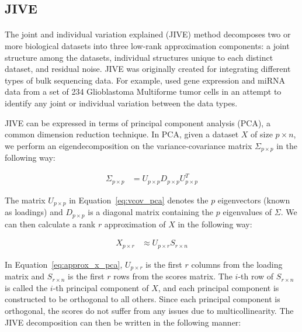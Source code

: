\documentclass[
12pt, %
letterpaper, %
oneside, %
headinclude,footinclude, %
BCOR5mm, %
]{scrartcl}
\begin{document}

\subsection{JIVE}

\paragraph*{}
The joint and individual variation explained (JIVE) method \citep{lock2013joint} decomposes two or more biological datasets into three low-rank approximation components: a joint structure among the datasets, individual structures unique to each distinct dataset, and residual noise. JIVE was originally created for integrating different types of bulk sequencing data. For example, \citet{lock2013joint} used gene expression and miRNA data from a set of 234 Glioblastoma Multiforme tumor cells in an attempt to identify any joint or individual variation between the data types. 

JIVE can be expressed in terms of principal component analysis (PCA), a common dimension reduction technique. In PCA, given a dataset $X$ of size $p \times n$, we perform an eigendecomposition on the variance-covariance matrix $\Sigma_{p \times p}$ in the following way:

\begin{align}
    \Sigma_{p \times p} &= U_{p \times p} D_{p \times p} U_{p \times p}^T
    \label{eq:vcov_pca}
\end{align}

The matrix $U_{p \times p}$ in Equation~\ref{eq:vcov_pca} denotes the $p$ eigenvectors (known as loadings) and $D_{p \times p}$ is a diagonal matrix containing the $p$ eigenvalues of $\Sigma$. We can then calculate a rank $r$ approximation of $X$ in the following way:

\begin{align}
    X_{p \times r} &\approx U_{p \times r} S_{r \times n}
    \label{eq:approx_x_pca}
\end{align}

In Equation~\ref{eq:approx_x_pca}, $U_{p \times r}$ is the first $r$ columns from the loading matrix and $S_{r \times n}$ is the first $r$ rows from the scores matrix. The $i$-th row of $S_{r \times n}$ is called the $i$-th principal component of $X$, and each principal component is constructed to be orthogonal to all others. Since each principal component is orthogonal, the scores do not suffer from any issues due to multicollinearity. The JIVE decomposition can then be written in the following manner:
\end{document}
